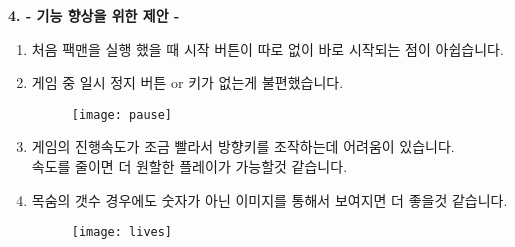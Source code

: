 \documentclass{article}
\begin{document}
\newpage
\begin{large}\textbf{4. - 기능 향상을 위한 제안 -}\end{large}
\begin{enumerate}
\item 처음 팩맨을 실행 했을 때 시작 버튼이 따로 없이 바로 시작되는 점이 아쉽습니다.
\item 게임 중 일시 정지 버튼 or 키가 없는게 불편했습니다.

 \begin{figure}[!h]
\centering
\texttt{[image: pause]}
\end{figure}

\item 게임의 진행속도가 조금 빨라서 방향키를 조작하는데 어려움이 있습니다.\\ 속도를 줄이면 더 원할한 플레이가 가능할것 같습니다.
\item 목숨의 갯수 경우에도 숫자가 아닌 이미지를 통해서 보여지면 더 좋을것 같습니다.
 \begin{figure}[!h]
\centering
\texttt{[image: lives]}
\end{figure}
\end{enumerate}
\end{document}

